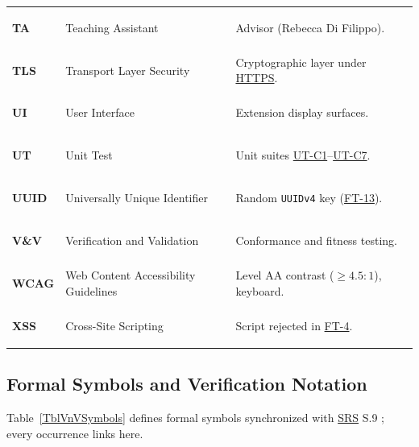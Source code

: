 \documentclass[12pt, titlepage]{article}
\newcommand{\HTTPS}{\hyperlink{vnv-acr-https}{HTTPS}}
\newcommand{\SRS}{\hyperlink{vnv-acr-srs}{SRS}}
\begin{document}
\begin{tabularx}{\textwidth}{l P{4.8cm} Y}
\hypertarget{vnv-acr-ta}{\textbf{TA}} & Teaching Assistant & Advisor (Rebecca Di Filippo).\\
\hypertarget{vnv-acr-tls}{\textbf{TLS}} & Transport Layer Security & Cryptographic layer under \HTTPS{}.\\
\hypertarget{vnv-acr-ui}{\textbf{UI}} & User Interface & Extension display surfaces.\\
\hypertarget{vnv-acr-ut}{\textbf{UT}} & Unit Test & Unit suites \hyperref[ut:C1]{UT-C1}--\hyperref[ut:C7]{UT-C7}.\\
\hypertarget{vnv-acr-uuid}{\textbf{UUID}} & Universally Unique Identifier & Random \texttt{UUIDv4} key (\hyperref[test:FT-13]{FT-13}).\\
\hypertarget{vnv-acr-vnv}{\textbf{V\&V}} & Verification and Validation & Conformance and fitness testing.\\
\hypertarget{vnv-acr-wcag}{\textbf{WCAG}} & Web Content Accessibility Guidelines & Level AA contrast ($\ge 4.5:1$), keyboard.\\
\hypertarget{vnv-acr-xss}{\textbf{XSS}} & Cross-Site Scripting & Script rejected in \hyperref[test:FT-4]{FT-4}.\\
\end{tabularx}
\endgroup

\subsection{Formal Symbols and Verification Notation}\label{subsec:symbols}

Table~\ref{TblVnVSymbols} defines formal symbols synchronized with \SRS{} S.9 \cite{VeritySRS2026}; every occurrence links here.
\end{document}
